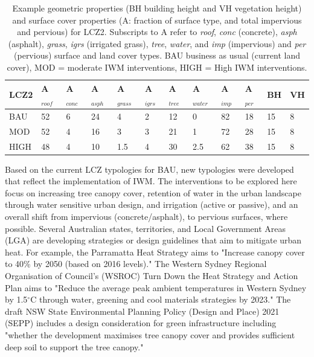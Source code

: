 \documentclass[final,3p,times,authoryear]{elsarticle}
\begin{document}
\setlength\arrayrulewidth{1pt} %
\begin{table}[!ht]
\caption{Example geometric properties (BH building height and VH vegetation height) and surface cover properties (A: fraction of surface type, and total impervious and pervious) for LCZ2. Subscripts to A refer to \textit{roof}, \textit{conc} (concrete), \textit{asph} (asphalt), \textit{grass}, \textit{igrs} (irrigated grass), \textit{tree}, \textit{water}, and \textit{imp} (impervious) and \textit{per} (pervious) surface and land cover types. BAU business as usual (current land cover), MOD = moderate IWM interventions, HIGH = High IWM interventions.}
    \centering
    \begin{tabular}{|l|l|l|l|l|l|l|l|l|l|l|l|}
    \hline
       \rowcolor{yellow!25} LCZ2  & A$_{roof}$  & A$_{conc}$  & A$_{asph}$  & A$_{grass}$  & A$_{igrs}$  & A$_{tree}$  & A$_{water}$  & A$_{imp}$  & A$_{per}$  & BH  & VH  \\ \hline
        BAU & 52 & 6 & 24 & 4 & 2 & 12 & 0 & 82 & 18 & 15 & 8 \\ \hline
        MOD & 52 & 4 & 16 & 3 & 3 & 21 & 1 & 72 & 28 & 15 & 8 \\ \hline
        HIGH & 48 & 4 & 10 & 1.5 & 4 & 30 & 2.5 & 62 & 38 & 15 & 8 \\ \hline
    \end{tabular}\label{table:lcz2}
\end{table}
\setlength\arrayrulewidth{0.4pt} %

Based on the current LCZ typologies for BAU, new typologies were developed that reflect the implementation of IWM. The interventions to be explored here focus on increasing tree canopy cover, retention of water in the urban landscape through water sensitive urban design, and irrigation (active or passive), and an overall shift from impervious (concrete/asphalt), to pervious surfaces, where possible. Several Australian states, territories, and Local Government Areas (LGA) are developing strategies or design guidelines that aim to mitigate urban heat. For example, the Parramatta Heat Strategy \citep{Paramatta2021} aims to "Increase canopy cover to 40\% by 2050 (based on 2016 levels)." The Western Sydney Regional Organisation of Council's (WSROC) \citep{WSROC2021} Turn Down the Heat Strategy and Action Plan aims to "Reduce the average peak ambient temperatures in Western Sydney by 1.5$^{\circ}$C through water, greening and cool materials strategies by 2023." The draft NSW State Environmental Planning Policy (Design and Place) 2021 (SEPP) \citep{NewSouthWales2021} includes a design consideration for green infrastructure including "whether the development maximises tree canopy cover and provides sufficient deep soil to support the tree canopy."
\end{document}
